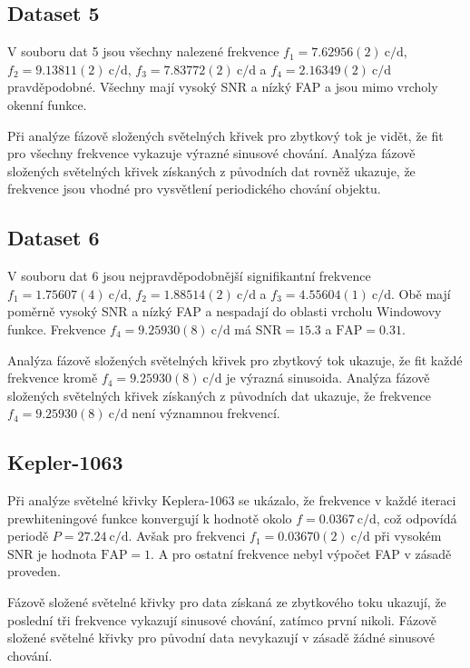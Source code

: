 \documentclass[a4paper,11pt,twocolumn]{article}
\begin{document}
        \subsection{Dataset 5}
            V souboru dat 5 jsou všechny nalezené frekvence $f_1 = 7.62956(2) ~\text{c/d}$, $f_2 = 9.13811(2) ~\text{c/d}$, $f_3 = 7.83772(2) ~\text{c/d}$ a $f_4 = 2.16349(2) ~\text{c/d}$ pravděpodobné. Všechny mají vysoký SNR a nízký FAP a jsou mimo vrcholy okenní funkce.
                
            Při analýze fázově složených světelných křivek pro zbytkový tok je vidět, že fit pro všechny frekvence vykazuje výrazné sinusové chování. Analýza fázově složených světelných křivek získaných z původních dat rovněž ukazuje, že frekvence jsou vhodné pro vysvětlení periodického chování objektu.

        \subsection{Dataset 6}
            V souboru dat 6 jsou nejpravděpodobnější signifikantní frekvence $f_1 = 1.75607(4) ~\text{c/d}$, $f_2 = 1.88514(2) ~\text{c/d}$ a $f_3 = 4.55604(1) ~\text{c/d}$. Obě mají poměrně vysoký SNR a nízký FAP a nespadají do oblasti vrcholu Windowovy funkce. Frekvence $f_4 = 9.25930(8) ~\text{c/d}$ má $\text{SNR} = 15.3$ a $\text{FAP} = 0.31$.
    
            Analýza fázově složených světelných křivek pro zbytkový tok ukazuje, že fit každé frekvence kromě $f_4 = 9.25930(8) ~\text{c/d}$ je výrazná sinusoida. Analýza fázově složených světelných křivek získaných z původních dat ukazuje, že frekvence $f_4 = 9.25930(8) ~\text{c/d}$ není významnou frekvencí.

        \subsection{Kepler-1063}
            Při analýze světelné křivky Keplera-1063 se ukázalo, že frekvence v každé iteraci prewhiteningové funkce konvergují k hodnotě okolo $f = 0.0367 ~\text{c/d}$, což odpovídá periodě $P = 27.24 ~\text{c/d}$. Avšak pro frekvenci $f_1 = 0.03670(2) ~\text{c/d}$ při vysokém SNR je hodnota $\text{FAP} = 1$. A pro ostatní frekvence nebyl výpočet FAP v zásadě proveden. 

            Fázově složené světelné křivky pro data získaná ze zbytkového toku ukazují, že poslední tři frekvence vykazují sinusové chování, zatímco první nikoli. Fázově složené světelné křivky pro původní data nevykazují v zásadě žádné sinusové chování. 
            
\end{document}
